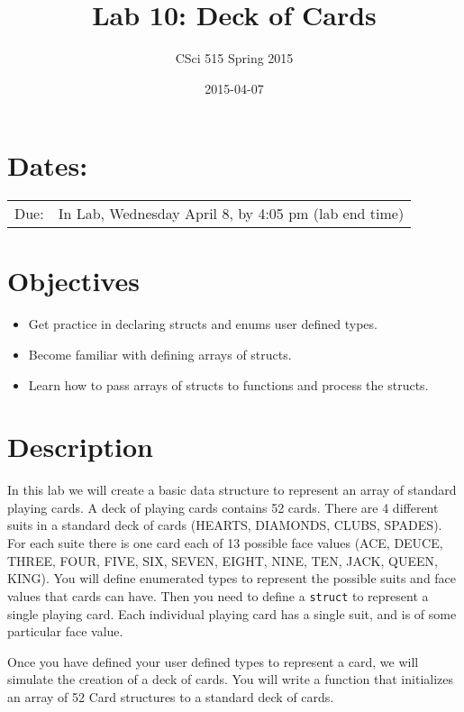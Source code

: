 \documentclass[11pt]{article}
\title{Lab 10: Deck of Cards}
\author{CSci 515 Spring 2015}
\date{2015-04-07}
\begin{document}
\maketitle


\section*{Dates:}
\label{sec-1}


\begin{center}
\begin{tabular}{ll}
 Due:  &  In Lab, Wednesday April 8, by 4:05 pm (lab end time)  \\
\end{tabular}
\end{center}
\section*{Objectives}
\label{sec-2}

\begin{itemize}
\item Get practice in declaring structs and enums user defined
  types.
\item Become familiar with defining arrays of structs.
\item Learn how to pass arrays of structs to functions and process
  the structs.
\end{itemize}
\section*{Description}
\label{sec-3}

In this lab we will create a basic data structure to represent
an array of standard playing cards.  A deck of playing
cards contains 52 cards.  There are 4 different suits
in a standard deck of cards (HEARTS, DIAMONDS, CLUBS, SPADES).
For each suite there is one card each of 13 possible face
values (ACE, DEUCE, THREE, FOUR, FIVE, SIX, SEVEN, EIGHT, NINE,
TEN, JACK, QUEEN, KING).  You will define enumerated types
to represent the possible suits and face values that cards
can have.  Then you need to define a \verb~struct~ to represent
a single playing card. Each individual playing card has
a single suit, and is of some particular face value.

Once you have defined your user defined types to represent a card, we
will simulate the creation of a deck of cards.  You will write a
function that initializes an array of 52 Card structures to a standard
deck of cards.
\end{document}
